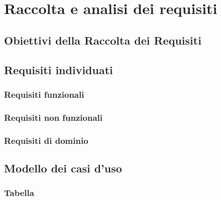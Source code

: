 \chapter{Raccolta e analisi dei requisiti}

\section{Obiettivi della Raccolta dei Requisiti}

\section{Requisiti individuati}
\subsection{Requisiti funzionali}
\subsection{Requisiti non funzionali}
\subsection{Requisiti di dominio}

\section{Modello dei casi d'uso}
\subsection{Tabella}

